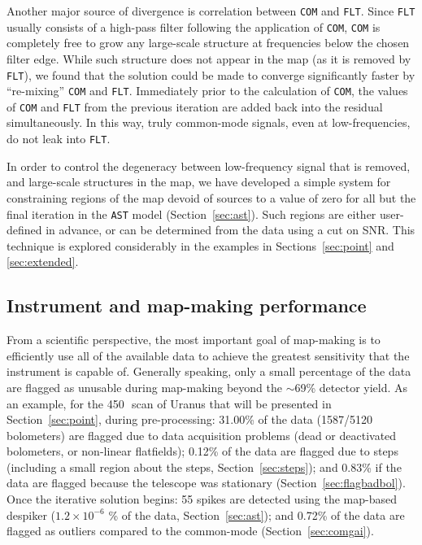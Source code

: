 \documentclass[useAMS,usenatbib,nofootinbib]{mn2e}
\newcommand{\snr}{SNR}
\newcommand{\model}[1]{\texttt{#1}}
\begin{document}
Another major source of divergence is correlation between \model{COM}
and \model{FLT}. Since \model{FLT} usually consists of a high-pass
filter following the application of \model{COM}, \model{COM} is
completely free to grow any large-scale structure at frequencies below
the chosen filter edge. While such structure does not appear in the
map (as it is removed by \model{FLT}), we found that the solution
could be made to converge significantly faster by ``re-mixing''
\model{COM} and \model{FLT}. Immediately prior to the calculation of
\model{COM}, the values of \model{COM} and \model{FLT} from the
previous iteration are added back into the residual simultaneously. In
this way, truly common-mode signals, even at low-frequencies, do not
leak into \model{FLT}.

In order to control the degeneracy between low-frequency signal that
is removed, and large-scale structures in the map, we have developed a
simple system for constraining regions of the map devoid of sources to
a value of zero for all but the final iteration in the \model{AST}
model (Section~\ref{sec:ast}). Such regions are either user-defined in
advance, or can be determined from the data using a cut on \snr. This
technique is explored considerably in the examples in
Sections~\ref{sec:point} and \ref{sec:extended}.


\subsection{Instrument and map-making performance}
\label{sec:performance}

From a scientific perspective, the most important goal of map-making
is to efficiently use all of the available data to achieve the
greatest sensitivity that the instrument is capable of. Generally
speaking, only a small percentage of the data are flagged as unusable
during map-making beyond the $\sim$69\% detector yield.  As an
example, for the 450\,\micron\ scan of Uranus that will be presented
in Section~\ref{sec:point}, during pre-processing: 31.00\% of the data
(1587/5120 bolometers) are flagged due to data acquisition problems
(dead or deactivated bolometers, or non-linear flatfields); 0.12\% of
the data are flagged due to steps (including a small region about the
steps, Section~\ref{sec:steps}); and 0.83\% if the data are flagged
because the telescope was stationary
(Section~\ref{sec:flagbadbol}). Once the iterative solution begins: 55
spikes are detected using the map-based despiker ($1.2\times10^{-6}$
\% of the data, Section~\ref{sec:ast}); and 0.72\% of the data are
flagged as outliers compared to the common-mode
(Section~\ref{sec:comgai}).
\end{document}
